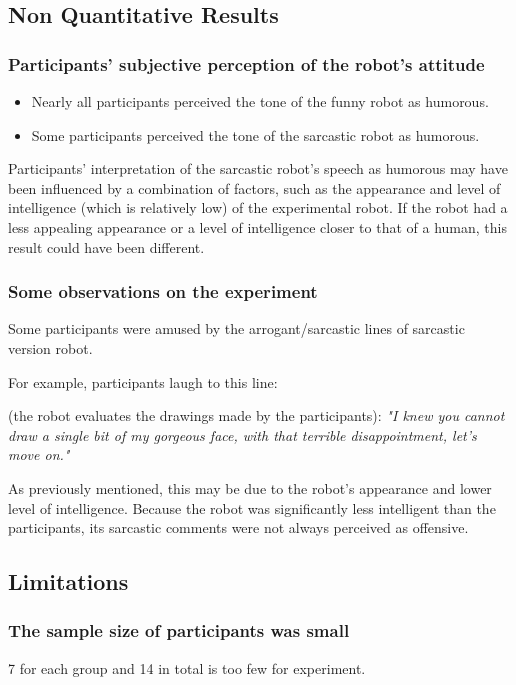 \documentclass[conference]{IEEEtran}
\begin{document}
\subsection{Non Quantitative Results}

\subsubsection{Participants' subjective perception of the robot's attitude}

\begin{itemize}
    \item Nearly all participants perceived the tone of the funny robot as humorous.
    \item Some participants perceived the tone of the sarcastic robot as humorous.
\end{itemize}

Participants' interpretation of the sarcastic robot's speech as humorous may have been influenced by a combination of factors, such as the appearance and level of intelligence (which is relatively low) of the experimental robot. If the robot had a less appealing appearance or a level of intelligence closer to that of a human, this result could have been different.

\subsubsection{Some observations on the experiment}

Some participants were amused by the arrogant/sarcastic lines of sarcastic version robot.

For example, participants laugh to this line:

(the robot evaluates the drawings made by the participants): \textit{"I knew you cannot draw a single bit of my gorgeous face, with that terrible disappointment, let's move on."}

As previously mentioned, this may be due to the robot's appearance and lower level of intelligence. Because the robot was significantly less intelligent than the participants, its sarcastic comments were not always perceived as offensive.

\subsection{Limitations}

\subsubsection{The sample size of participants was small} 7 for each group and 14 in total is too few for experiment.
\end{document}
